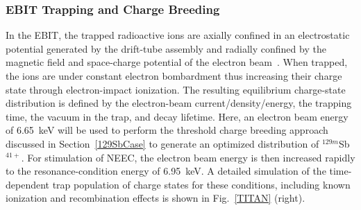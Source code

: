 \documentclass[12pt]{article}
\begin{document}
\subsubsection{\label{multi}EBIT Trapping and Charge Breeding}
In the EBIT, the trapped radioactive ions are axially confined in an electrostatic potential generated by the drift-tube assembly and radially confined by the magnetic field and space-charge potential of the electron beam~\cite{Lap10}.  When trapped, the ions are under constant electron bombardment thus increasing their charge state through electron-impact ionization.  The resulting equilibrium charge-state distribution is defined by the electron-beam current/density/energy, the trapping time, the vacuum in the trap, and decay lifetime.  Here, an electron beam energy of 6.65~keV will be used to perform the threshold charge breeding approach discussed in Section~\ref{129SbCase} to generate an optimized distribution of $^{129m}$Sb$^{41+}$.  For stimulation of NEEC, the electron beam energy is then increased rapidly to the resonance-condition energy of 6.95~keV.  A detailed simulation of the time-dependent trap population of charge states for these conditions, including known ionization and recombination effects is shown in Fig.~\ref{TITAN} (right).


\end{document}
